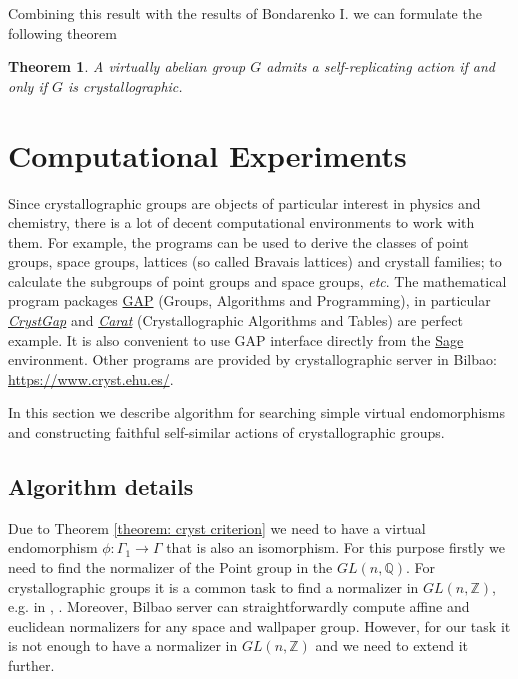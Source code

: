 \documentclass[a4paper,12pt]{amsart}
\newtheorem{theorem}{Theorem}
\theoremstyle{definition}
\begin{document}
	Combining this result with the results of Bondarenko I. we can formulate the following theorem
	\begin{theorem}
		A virtually abelian group $G$ admits a self-replicating action if and only if $G$ is crystallographic.
	\end{theorem}

	\newpage
	\section{Computational Experiments} \label{section:experiments}
	Since crystallographic groups are objects of particular interest in physics and chemistry, there is a lot of decent computational environments to work with them. For example, the programs can be used to derive the classes of point groups, space groups, lattices (so called Bravais lattices) and crystall families; to calculate the subgroups of point groups and space groups, \textit{etc}. The mathematical program packages \href{https://www.gap-system.org/}{GAP} (Groups, Algorithms and Programming), in particular \href{https://www.gap-system.org/Packages/cryst.html}{\textit{CrystGap}} and \href{https://lbfm-rwth.github.io/carat/}{\textit{Carat}} (Crystallographic Algorithms and Tables) are perfect example. It is also convenient to use GAP interface directly from the \href{https://www.sagemath.org/}{Sage} environment. Other programs are provided by crystallographic server in Bilbao: \href{https://www.cryst.ehu.es/}{https://www.cryst.ehu.es/}.
	
	In this section we describe algorithm for searching simple virtual endomorphisms and constructing faithful self-similar actions of crystallographic groups.  
	
	\subsection{Algorithm details} Due to Theorem \ref{theorem: cryst criterion} we need to have a virtual endomorphism $\phi: \Gamma_1 \rightarrow \Gamma$ that is also an isomorphism. 
	For this purpose firstly we need to find the normalizer of the Point group in the $GL(n, \mathbb{Q})$. For crystallographic groups it is a common task to find a normalizer in $GL(n, \mathbb{Z})$, e.g. in \cite{cryst:international tables}, \cite{cryst:group_theory}. Moreover, Bilbao server \cite{cryts: online tool} can straightforwardly compute affine and euclidean normalizers for any space and wallpaper group. However, for our task it is not enough to have a normalizer in $GL(n, \mathbb{Z})$ and we need to extend it further.
	
\end{document}
